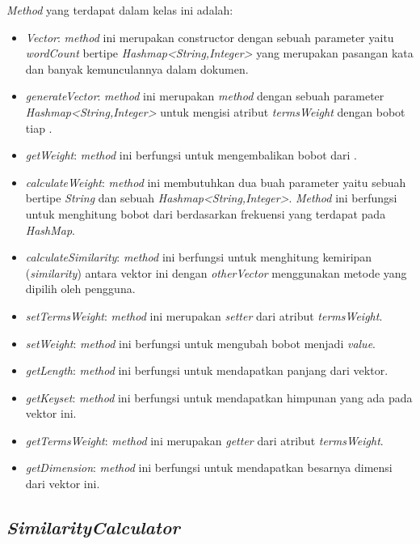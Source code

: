 \textit{Method} yang terdapat dalam kelas ini adalah:

\begin{itemize}
	\item \textit{Vector}: \textit{method} ini merupakan constructor dengan sebuah parameter yaitu \textit{wordCount} bertipe \textit{Hashmap<String,Integer>} yang merupakan pasangan kata dan banyak kemunculannya dalam dokumen.
	\item \textit{generateVector}: \textit{method} ini merupakan \textit{method} dengan sebuah parameter \textit{Hashmap<String,Integer>} untuk mengisi atribut \textit{termsWeight} dengan bobot tiap \term.
	\item \textit{getWeight}: \textit{method} ini berfungsi untuk mengembalikan bobot dari \term.
	\item \textit{calculateWeight}: \textit{method} ini membutuhkan dua buah parameter yaitu sebuah \term bertipe \textit{String} dan sebuah \textit{Hashmap<String,Integer>}. \textit{Method} ini berfungsi untuk menghitung bobot dari \term berdasarkan frekuensi yang terdapat pada \textit{HashMap}.
	\item \textit{calculateSimilarity}: \textit{method} ini berfungsi untuk menghitung kemiripan (\textit{similarity}) antara vektor ini dengan \textit{otherVector} menggunakan metode yang dipilih oleh pengguna.
	\item \textit{setTermsWeight}: \textit{method} ini merupakan \textit{setter} dari atribut \textit{termsWeight}.
	\item \textit{setWeight}: \textit{method} ini berfungsi untuk mengubah bobot \term menjadi \textit{value}.
	\item \textit{getLength}: \textit{method} ini berfungsi untuk mendapatkan panjang dari vektor.
	\item \textit{getKeyset}: \textit{method} ini berfungsi untuk mendapatkan himpunan \term yang ada pada vektor ini.
	\item \textit{getTermsWeight}: \textit{method} ini merupakan \textit{getter} dari atribut \textit{termsWeight}.
	\item \textit{getDimension}: \textit{method} ini berfungsi untuk mendapatkan besarnya dimensi dari vektor ini.
\end{itemize}

\subsection{\textit{SimilarityCalculator}}


